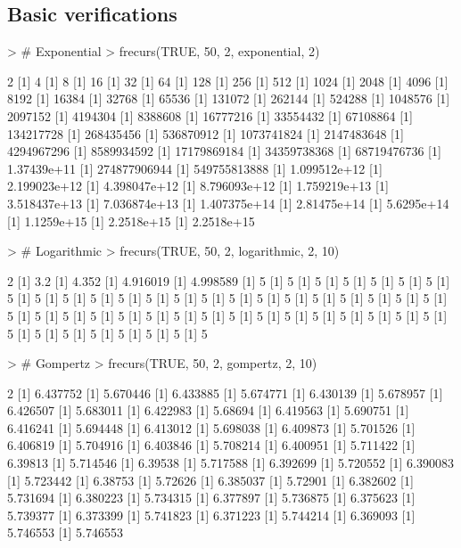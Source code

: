 \documentclass{article}
\begin{document}
\subsection{Basic verifications}
\begin{Schunk}
\begin{Sinput}
> # Exponential
> frecurs(TRUE, 50, 2, exponential, 2)
\end{Sinput}
\begin{Soutput}
[1] 2
[1] 4
[1] 8
[1] 16
[1] 32
[1] 64
[1] 128
[1] 256
[1] 512
[1] 1024
[1] 2048
[1] 4096
[1] 8192
[1] 16384
[1] 32768
[1] 65536
[1] 131072
[1] 262144
[1] 524288
[1] 1048576
[1] 2097152
[1] 4194304
[1] 8388608
[1] 16777216
[1] 33554432
[1] 67108864
[1] 134217728
[1] 268435456
[1] 536870912
[1] 1073741824
[1] 2147483648
[1] 4294967296
[1] 8589934592
[1] 17179869184
[1] 34359738368
[1] 68719476736
[1] 1.37439e+11
[1] 274877906944
[1] 549755813888
[1] 1.099512e+12
[1] 2.199023e+12
[1] 4.398047e+12
[1] 8.796093e+12
[1] 1.759219e+13
[1] 3.518437e+13
[1] 7.036874e+13
[1] 1.407375e+14
[1] 2.81475e+14
[1] 5.6295e+14
[1] 1.1259e+15
[1] 2.2518e+15
[1] 2.2518e+15
\end{Soutput}
\begin{Sinput}
> # Logarithmic
> frecurs(TRUE, 50, 2, logarithmic, 2, 10)
\end{Sinput}
\begin{Soutput}
[1] 2
[1] 3.2
[1] 4.352
[1] 4.916019
[1] 4.998589
[1] 5
[1] 5
[1] 5
[1] 5
[1] 5
[1] 5
[1] 5
[1] 5
[1] 5
[1] 5
[1] 5
[1] 5
[1] 5
[1] 5
[1] 5
[1] 5
[1] 5
[1] 5
[1] 5
[1] 5
[1] 5
[1] 5
[1] 5
[1] 5
[1] 5
[1] 5
[1] 5
[1] 5
[1] 5
[1] 5
[1] 5
[1] 5
[1] 5
[1] 5
[1] 5
[1] 5
[1] 5
[1] 5
[1] 5
[1] 5
[1] 5
[1] 5
[1] 5
[1] 5
[1] 5
[1] 5
[1] 5
\end{Soutput}
\begin{Sinput}
> # Gompertz
> frecurs(TRUE, 50, 2, gompertz, 2, 10)
\end{Sinput}
\begin{Soutput}
[1] 2
[1] 6.437752
[1] 5.670446
[1] 6.433885
[1] 5.674771
[1] 6.430139
[1] 5.678957
[1] 6.426507
[1] 5.683011
[1] 6.422983
[1] 5.68694
[1] 6.419563
[1] 5.690751
[1] 6.416241
[1] 5.694448
[1] 6.413012
[1] 5.698038
[1] 6.409873
[1] 5.701526
[1] 6.406819
[1] 5.704916
[1] 6.403846
[1] 5.708214
[1] 6.400951
[1] 5.711422
[1] 6.39813
[1] 5.714546
[1] 6.39538
[1] 5.717588
[1] 6.392699
[1] 5.720552
[1] 6.390083
[1] 5.723442
[1] 6.38753
[1] 5.72626
[1] 6.385037
[1] 5.72901
[1] 6.382602
[1] 5.731694
[1] 6.380223
[1] 5.734315
[1] 6.377897
[1] 5.736875
[1] 6.375623
[1] 5.739377
[1] 6.373399
[1] 5.741823
[1] 6.371223
[1] 5.744214
[1] 6.369093
[1] 5.746553
[1] 5.746553
\end{Soutput}
\end{Schunk}
\end{document}
